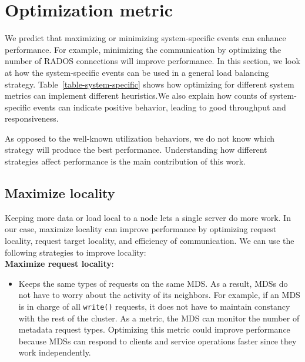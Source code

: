 \section{Optimization metric}
We predict that maximizing or minimizing system-specific events can enhance performance. For example, minimizing the communication by optimizing the number of RADOS connections will improve performance. In this section, we look at how the system-specific events can be used in a general load balancing strategy. Table~\ref{table-system-specific} shows how optimizing for different system metrics can implement different heuristics.We also explain how counts of system-specific events can indicate positive behavior, leading to good throughput and responsiveness. 

As opposed to the well-known utilization behaviors, we do not know which strategy will produce the best performance. Understanding how different strategies affect performance is the main contribution of this work.

\subsection{Maximize locality}
Keeping more data or load local to a node lets a single server do more work. In our case, maximize locality can improve performance by optimizing request locality, request target locality, and efficiency of communication. We can use the following strategies to improve locality:\\

\noindent\textbf{Maximize request locality}: 
\begin{itemize}
	\item[] Keeps the same types of requests on the same MDS. As a result, MDSs do not have to worry about the activity of its neighbors. For example, if an MDS is in charge of all \texttt{write()} requests, it does not have to maintain constancy with the rest of the cluster. As a metric, the MDS can monitor the number of metadata request types. Optimizing this metric could improve performance because MDSs can respond to clients and service operations faster since they work independently.
\end{itemize}

